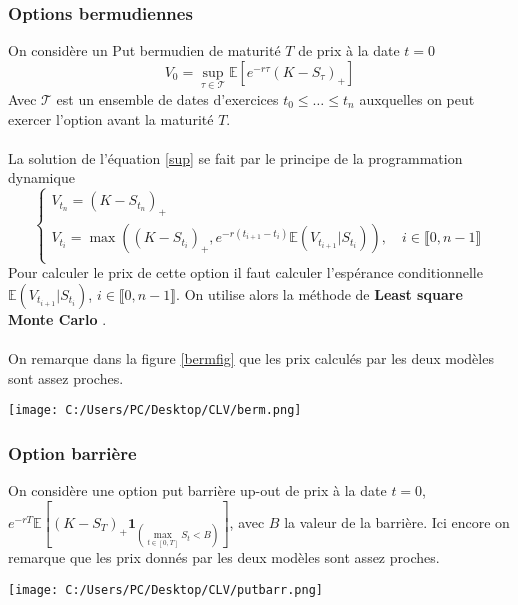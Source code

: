 \documentclass[a4paper,12pt]{report}
\numberwithin{equation}{section}
\theoremstyle{definition}
\numberwithin{equation}{section}
\begin{document}
\subsubsection{Options bermudiennes}
On considère un Put bermudien de maturité $T$ de prix à la date $t=0$ 
\begin{equation}
\label{sup}
V_0 = \underset{\tau \in \mathcal{T}}{\sup} \mathbb{E}\left[ e^{-r \tau} ( K - S_{\tau})_+ \right]
\end{equation}
Avec $\mathcal{T}$ est un ensemble de dates d'exercices $t_0\leq \dots \leq t_n$ auxquelles on peut exercer l'option avant la maturité $T$. \\\\
La solution de l'équation \ref{sup} se fait par le principe de la  programmation dynamique 
\begin{equation}
\left\{
    \begin{array}{l}
       V_{t_n} = \left( K - S_{t_n} \right)_+\\
       V_{t_i} = \max \left( \left( K - S_{t_i} \right)_+,  e^{-r(t_{i+1}-t_i)}\mathbb{E}\left( V_{t_{i+1}} | S_{t_i} \right) \right),\quad i \in \llbracket 0, n-1 \rrbracket \\
    \end{array}
\right.
\end{equation}
Pour calculer le prix de cette option il faut calculer l'espérance conditionnelle $\mathbb{E}\left( V_{t_{i+1}} | S_{t_i} \right)$, $ i \in \llbracket 0, n-1 \rrbracket$. On utilise alors la méthode de \textbf{Least square Monte Carlo} \cite{LSMC}.\\\\
On remarque dans la figure \ref{bermfig} que les prix calculés par les deux modèles sont assez proches.
\begin{center}
\label{bermfig}
\texttt{[image: C:/Users/PC/Desktop/CLV/berm.png]}
\end{center}
\subsubsection{Option barrière}
On considère une option put barrière up-out de prix à la date $t=0$, $e^{-rT}\mathbb{E}\left[ (K - S_T)_+ \textbf{1}_{(\underset{t \in [0, T]}{\max} S_t < B)} \right]$, avec $B$ la valeur de la barrière. Ici encore on remarque que les prix donnés par les deux modèles sont assez proches.
\begin{center}
\texttt{[image: C:/Users/PC/Desktop/CLV/putbarr.png]}
\end{center}
\end{document}
